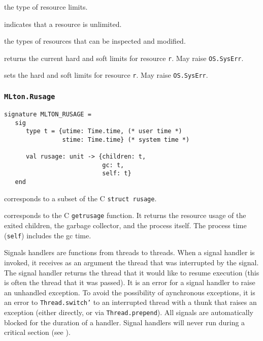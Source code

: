 \begin{description}
the type of resource limits.

indicates that a resource is unlimited.

the types of resources that can be inspected and modified.

returns the current hard and soft limits for resource {\tt r}. May
raise {\tt OS.SysErr}.

sets the hard and soft limits for resource {\tt r}.  May raise {\tt OS.SysErr}.
\end{description}
%
\subsubsection{\tt MLton.Rusage}

\begin{verbatim}
signature MLTON_RUSAGE =
   sig
      type t = {utime: Time.time, (* user time *)
                stime: Time.time} (* system time *)
         
      val rusage: unit -> {children: t,
                           gc: t,
                           self: t}
   end
\end{verbatim}

\begin{description}
corresponds to a subset of the C {\tt struct rusage}.

corresponds to the C {\tt getrusage} function.  It returns the
resource usage of the exited children, the garbage collector, and the
process itself.  The process time ({\tt self}) includes the gc time.
\end{description}

Signals handlers are functions from threads to threads.  When a signal
handler is invoked, it receives as an argument the thread that was
interrupted by the signal.  The signal handler returns the thread that
it would like to resume execution (this is often the thread that it
was passed).  It is an error for a signal handler to raise an
unhandled exception.  To avoid the possibility of aynchronous
exceptions, it is an error to {\tt Thread.switch'} to an
interrupted thread with a thunk that raises an exception (either
directly, or via {\tt Thread.prepend}). All signals are automatically
blocked for the duration of a handler.  Signal handlers will never run
during a critical section (see ).

